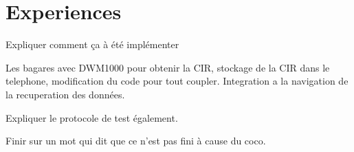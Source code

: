 \chapter{Experiences}

Expliquer comment ça à été implémenter

Les bagares avec DWM1000 pour obtenir la CIR, stockage de la CIR dans le telephone, modification du code pour tout coupler. Integration a la navigation de la recuperation des données.

Expliquer le protocole de test également.

Finir sur un mot qui dit que ce n'est pas fini à cause du coco.